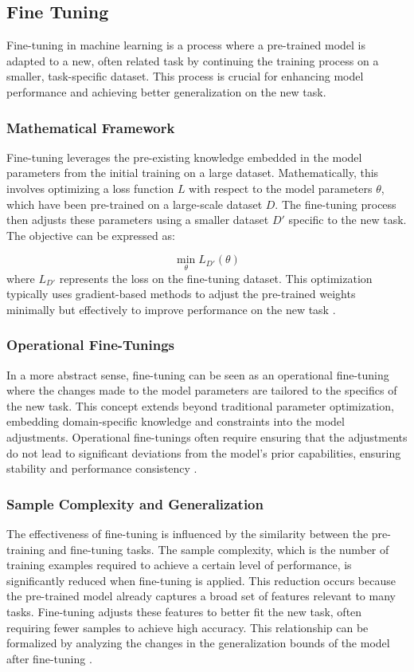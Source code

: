 \subsection*{Fine Tuning} %
Fine-tuning in machine learning is a process where a pre-trained model is adapted to a new, often related task by continuing the training process on a smaller, task-specific dataset. This process is crucial for enhancing model performance and achieving better generalization on the new task.

\subsubsection*{Mathematical Framework}
Fine-tuning leverages the pre-existing knowledge embedded in the model parameters from the initial training on a large dataset. Mathematically, this involves optimizing a loss function $L$ with respect to the model parameters $\theta$, which have been pre-trained on a large-scale dataset $D$. The fine-tuning process then adjusts these parameters using a smaller dataset $D'$ specific to the new task. The objective can be expressed as:

\[
\min_{\theta} L_{D'}(\theta)
\]
where $L_{D'}$ represents the loss on the fine-tuning dataset. This optimization typically uses gradient-based methods to adjust the pre-trained weights minimally but effectively to improve performance on the new task \cite{Lalor2017Improving}.

\subsubsection*{Operational Fine-Tunings}
In a more abstract sense, fine-tuning can be seen as an operational fine-tuning where the changes made to the model parameters are tailored to the specifics of the new task. This concept extends beyond traditional parameter optimization, embedding domain-specific knowledge and constraints into the model adjustments. Operational fine-tunings often require ensuring that the adjustments do not lead to significant deviations from the model's prior capabilities, ensuring stability and performance consistency \cite{Catani2020A}.

\subsubsection*{Sample Complexity and Generalization}
The effectiveness of fine-tuning is influenced by the similarity between the pre-training and fine-tuning tasks. The sample complexity, which is the number of training examples required to achieve a certain level of performance, is significantly reduced when fine-tuning is applied. This reduction occurs because the pre-trained model already captures a broad set of features relevant to many tasks. Fine-tuning adjusts these features to better fit the new task, often requiring fewer samples to achieve high accuracy. This relationship can be formalized by analyzing the changes in the generalization bounds of the model after fine-tuning \cite{Shachaf2021A}.

